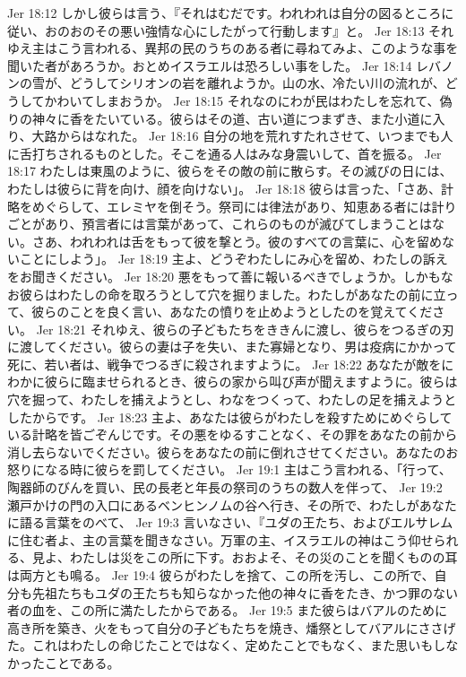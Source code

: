 Jer 18:12  しかし彼らは言う、『それはむだです。われわれは自分の図るところに従い、おのおのその悪い強情な心にしたがって行動します』と。
Jer 18:13  それゆえ主はこう言われる、異邦の民のうちのある者に尋ねてみよ、このような事を聞いた者があろうか。おとめイスラエルは恐ろしい事をした。
Jer 18:14  レバノンの雪が、どうしてシリオンの岩を離れようか。山の水、冷たい川の流れが、どうしてかわいてしまおうか。
Jer 18:15  それなのにわが民はわたしを忘れて、偽りの神々に香をたいている。彼らはその道、古い道につまずき、また小道に入り、大路からはなれた。
Jer 18:16  自分の地を荒れすたれさせて、いつまでも人に舌打ちされるものとした。そこを通る人はみな身震いして、首を振る。
Jer 18:17  わたしは東風のように、彼らをその敵の前に散らす。その滅びの日には、わたしは彼らに背を向け、顔を向けない」。
Jer 18:18  彼らは言った、「さあ、計略をめぐらして、エレミヤを倒そう。祭司には律法があり、知恵ある者には計りごとがあり、預言者には言葉があって、これらのものが滅びてしまうことはない。さあ、われわれは舌をもって彼を撃とう。彼のすべての言葉に、心を留めないことにしよう」。
Jer 18:19  主よ、どうぞわたしにみ心を留め、わたしの訴えをお聞きください。
Jer 18:20  悪をもって善に報いるべきでしょうか。しかもなお彼らはわたしの命を取ろうとして穴を掘りました。わたしがあなたの前に立って、彼らのことを良く言い、あなたの憤りを止めようとしたのを覚えてください。
Jer 18:21  それゆえ、彼らの子どもたちをききんに渡し、彼らをつるぎの刃に渡してください。彼らの妻は子を失い、また寡婦となり、男は疫病にかかって死に、若い者は、戦争でつるぎに殺されますように。
Jer 18:22  あなたが敵をにわかに彼らに臨ませられるとき、彼らの家から叫び声が聞えますように。彼らは穴を掘って、わたしを捕えようとし、わなをつくって、わたしの足を捕えようとしたからです。
Jer 18:23  主よ、あなたは彼らがわたしを殺すためにめぐらしている計略を皆ごぞんじです。その悪をゆるすことなく、その罪をあなたの前から消し去らないでください。彼らをあなたの前に倒れさせてください。あなたのお怒りになる時に彼らを罰してください。
Jer 19:1  主はこう言われる、「行って、陶器師のびんを買い、民の長老と年長の祭司のうちの数人を伴って、
Jer 19:2  瀬戸かけの門の入口にあるベンヒンノムの谷へ行き、その所で、わたしがあなたに語る言葉をのべて、
Jer 19:3  言いなさい、『ユダの王たち、およびエルサレムに住む者よ、主の言葉を聞きなさい。万軍の主、イスラエルの神はこう仰せられる、見よ、わたしは災をこの所に下す。おおよそ、その災のことを聞くものの耳は両方とも鳴る。
Jer 19:4  彼らがわたしを捨て、この所を汚し、この所で、自分も先祖たちもユダの王たちも知らなかった他の神々に香をたき、かつ罪のない者の血を、この所に満たしたからである。
Jer 19:5  また彼らはバアルのために高き所を築き、火をもって自分の子どもたちを焼き、燔祭としてバアルにささげた。これはわたしの命じたことではなく、定めたことでもなく、また思いもしなかったことである。
